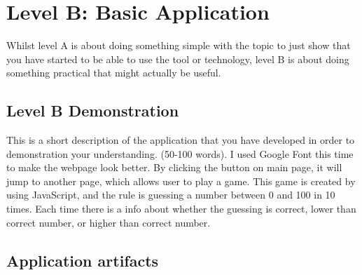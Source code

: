 \documentclass[a4paper, 11pt]{report}
\begin{document}
\newpage
\section{Level B: Basic Application}

Whilst level A is about doing something simple with the topic to just show that you have started to be able to use the tool or technology, level B is about doing something practical that might actually be useful.

\subsection{Level B Demonstration}

This is a short description of the application that you have developed in order to demonstration your understanding. (50-100 words).
\newline
\newline
I used Google Font this time to make the webpage look better. By clicking the button on main page, it will jump to another page, which allows user to play a game. This game is created by using JavaScript, and the rule is guessing a number between 0 and 100 in 10 times. Each time there is a info about whether the guessing is correct, lower than correct number, or higher than correct number.
\newline
\newline
\subsection{Application artifacts}
\end{document}
